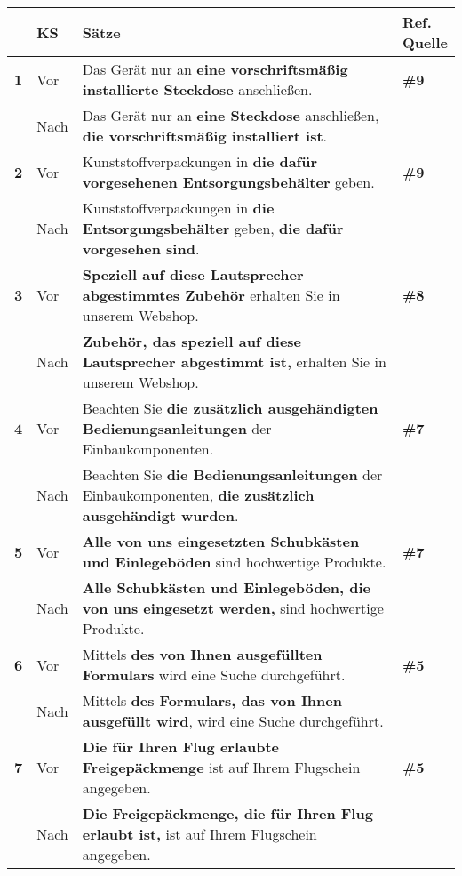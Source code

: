 \begin{longtable}{llp{}l}

\lsptoprule
{} & \textbf{KS} & \textbf{Sätze} & \makecell[tl]{\textbf{Ref.}\\\textbf{Quelle}}\\
\midrule
{ \textbf{1}} & Vor & Das Gerät nur an \textbf{eine vorschriftsmäßig installierte Steckdose} anschließen. & \textbf{\#9}\\
& Nach & Das Gerät nur an \textbf{eine Steckdose} anschließen, \textbf{die vorschriftsmäßig installiert ist}. & \\
\tablevspace
{ \textbf{2}} & Vor & Kunststoffverpackungen in \textbf{die dafür vorgesehenen Entsorgungsbehälter} geben. & \textbf{\#9}\\
& Nach & Kunststoffverpackungen in \textbf{die Entsorgungsbehälter} geben, \textbf{die dafür vorgesehen sind}. & \\
\tablevspace
{ \textbf{3}} & Vor & \textbf{Speziell auf diese Lautsprecher abgestimmtes Zubehör} erhalten Sie in unserem Webshop. & \textbf{\#8}\\
& Nach & \textbf{Zubehör, das speziell auf diese Lautsprecher abgestimmt ist,} erhalten Sie in unserem Webshop. & \\
\tablevspace
{ \textbf{4}} & Vor & Beachten Sie \textbf{die zusätzlich ausgehändigten Bedienungsanleitungen} der Einbaukomponenten. & \textbf{\#7}\\
& Nach & Beachten Sie \textbf{die Bedienungsanleitungen} der Einbaukomponenten, \textbf{die zusätzlich ausgehändigt wurden}. & \\
\tablevspace
{ \textbf{5}} & Vor & \textbf{Alle von uns eingesetzten Schubkästen und Einlegeböden} sind hochwertige Produkte. & \textbf{\#7}\\
& Nach & \textbf{Alle Schubkästen und Einlegeböden, die von uns eingesetzt werden,} sind hochwertige Produkte. & \\
\tablevspace
{ \textbf{6}} & Vor & Mittels \textbf{des von Ihnen ausgefüllten Formulars} wird eine Suche durchgeführt. & \textbf{\#5}\\
& Nach & Mittels \textbf{des Formulars, das von Ihnen ausgefüllt wird}, wird eine Suche durchgeführt. & \\
\tablevspace
{ \textbf{7}} & Vor & \textbf{Die für Ihren Flug erlaubte Freigepäckmenge} ist auf Ihrem Flugschein angegeben. & \textbf{\#5}\\
& Nach & \textbf{Die Freigepäckmenge, die für Ihren Flug erlaubt ist,} ist auf Ihrem Flugschein angegeben. & \\

\end{longtable}
